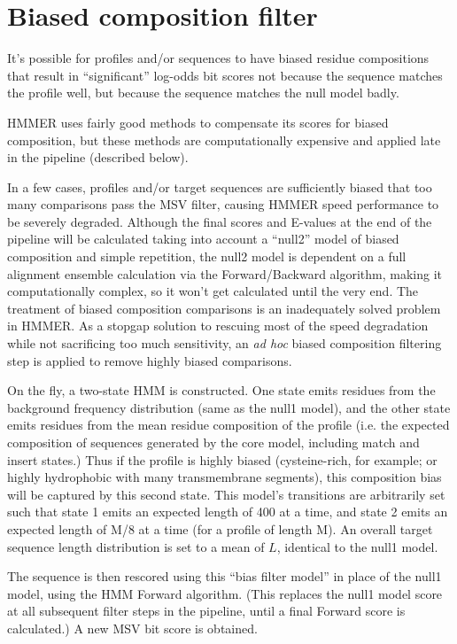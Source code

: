 \section{Biased composition filter}

It's possible for profiles and/or sequences to have biased residue
compositions that result in ``significant'' log-odds bit scores not
because the sequence matches the profile well, but because the
sequence matches the null model badly.

HMMER uses fairly good methods to compensate its scores for biased
composition, but these methods are computationally expensive and
applied late in the pipeline (described below).

In a few cases, profiles and/or target sequences are sufficiently
biased that too many comparisons pass the MSV filter, causing HMMER
speed performance to be severely degraded. Although the final scores
and E-values at the end of the pipeline will be calculated taking into
account a ``null2'' model of biased composition and simple repetition,
the null2 model is dependent on a full alignment ensemble calculation
via the Forward/Backward algorithm, making it computationally complex,
so it won't get calculated until the very end. The treatment of biased
composition comparisons is an inadequately solved problem in HMMER. As
a stopgap solution to rescuing most of the speed degradation while not
sacrificing too much sensitivity, an \emph{ad hoc} biased composition
filtering step is applied to remove highly biased comparisons.

On the fly, a two-state HMM is constructed. One state emits residues
from the background frequency distribution (same as the null1 model),
and the other state emits residues from the mean residue composition
of the profile (i.e. the expected composition of sequences generated
by the core model, including match and insert
states.) Thus if
the profile is highly biased (cysteine-rich, for example; or highly
hydrophobic with many transmembrane segments), this composition bias
will be captured by this second state. This model's transitions are
arbitrarily set such that state 1 emits an expected length of 400 at a
time, and state 2 emits an expected length of M/8 at a time (for a
profile of length M). An overall target sequence length distribution
is set to a mean of $L$, identical to the null1 model.

The sequence is then rescored using this ``bias filter model'' in
place of the null1 model, using the HMM Forward algorithm. (This
replaces the null1 model score at all subsequent filter steps in the
pipeline, until a final Forward score is calculated.) A new MSV bit
score is obtained.

